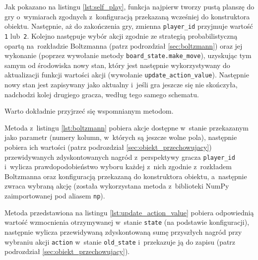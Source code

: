 \documentclass[a4paper, 12pt, oneside]{report}
\begin{document}
Jak pokazano na listingu \ref{lst:self_play}, funkcja najpierw tworzy pustą planszę do gry o~wymiarach zgodnych z~konfiguracją przekazaną wcześniej do konstruktora obiektu. Następnie, aż do zakończenia gry, zmienna \texttt{player\_id} przyjmuje wartość \texttt{1} lub~\texttt{2}. Kolejno następuje wybór akcji zgodnie ze strategią probabilistyczną opartą na~rozkładzie Boltzmanna (patrz podrozdział \ref{sec:boltzmann}) oraz jej wykonanie (poprzez wywołanie metody \texttt{board\_state.make\_move}), uzyskując tym samym od środowiska nowy stan, który jest następnie wykorzystywany do aktualizacji funkcji wartości akcji (wywołanie \texttt{update\_action\_value}). Następnie nowy stan jest zapisywany jako aktualny i~jeśli gra jeszcze się nie skończyła, nadchodzi kolej drugiego gracza, według tego samego schematu.

Warto dokładnie przyjrzeć się wspomnianym metodom.



Metoda z~listingu \ref{lst:boltzmann} pobiera akcje dostępne w~stanie przekazanym jako parametr (numery kolumn, w~których są jeszcze wolne pola), następnie pobiera ich wartości (patrz podrozdział \ref{sec:obiekt_przechowujacy}) przewidywanych zdyskontowanych nagród z~perspektywy gracza \texttt{player\_id} i~wylicza prawdopodobieństwo wyboru każdej z~nich zgodnie z~rozkładem Boltzmanna oraz konfiguracją przekazaną do konstruktora obiektu, a~następnie zwraca wybraną akcję (została wykorzystana metoda z~biblioteki NumPy zaimportowanej pod aliasem \texttt{np}).

\needspace{5em}



Metoda przedstawiona na listingu \ref{lst:update_action_value} pobiera odpowiednią wartość wzmocnienia otrzymywanej w~stanie \texttt{state} (na podstawie konfiguracji), następnie wylicza przewidywaną zdyskontowaną sumę przyszłych nagród przy wybraniu akcji \texttt{action} w~stanie \texttt{old\_state} i~przekazuje ją do zapisu (patrz podrozdział \ref{sec:obiekt_przechowujacy}).
\end{document}
